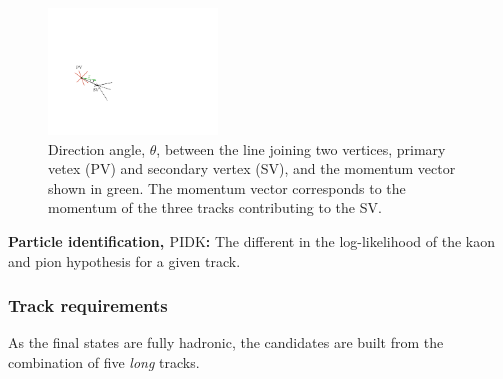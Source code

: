 \begin{description}
\begin{figure}[!h]
    \centering
    \includegraphics[width=0.4\textwidth]{figs/Selection/DIRA.pdf}
    \caption{Direction angle, $\theta$, between the line joining two vertices, primary vetex (PV) and secondary vertex (SV), and the momentum vector shown in green. The momentum vector corresponds to the momentum of the three tracks contributing to the SV. }
    \label{fig:dira}   
\end{figure}


\item \textbf{Particle identification, $\text{PIDK}$:} The different in the log-likelihood of the kaon and pion hypothesis for a given track.  
\end{description}


\subsubsection{Track requirements}
As the final states are fully hadronic, the candidates are built from the combination of five \emph{long} tracks. 

